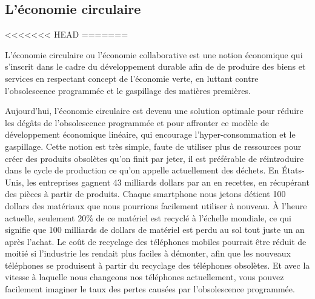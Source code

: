 \subsection{L'économie circulaire}


<<<<<<< HEAD
\loremipsum
=======

L’économie circulaire ou l’économie collaborative est une notion économique qui s'inscrit dans le cadre du développement durable afin de de produire des biens et services en respectant concept de l'économie verte, en luttant contre l'obsolescence programmée et le gaspillage des matières premières.

Aujourd'hui, l'économie circulaire est devenu une solution optimale pour réduire les dégâts de l'obsolescence programmée et pour affronter ce modèle de développement économique linéaire, qui encourage l’hyper-consommation et le gaspillage. Cette notion est très simple, faute de utiliser plus de ressources pour créer des produits obsolètes qu'on finit par jeter, il est préférable de réintroduire dans le cycle de production ce qu'on appelle actuellement des déchets.
En États-Unis, les entreprises gagnent 43 milliards dollars par an en recettes, en récupérant des pièces à partir de produits. Chaque smartphone nous jetons détient 100 dollars des matériaux que nous pourrions facilement utiliser à nouveau.     À l'heure actuelle, seulement 20\% de ce matériel est recyclé à l'échelle mondiale, ce qui signifie que 100 milliards de dollars de matériel est perdu au sol tout juste un an après l'achat. Le coût de recyclage des téléphones mobiles pourrait être réduit de moitié si l'industrie les rendait plus faciles à démonter, afin que les nouveaux téléphones se produisent à partir du recyclage des téléphones obsolètes. Et avec la vitesse à laquelle nous changeons nos téléphones actuellement, vous pouvez facilement imaginer le taux des pertes causées par l'obsolescence programmée.

